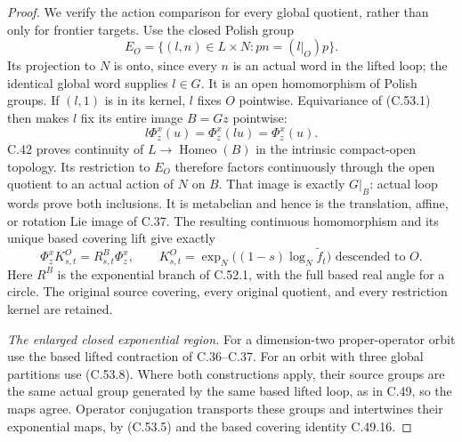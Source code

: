 \begin{proof}
We verify the action comparison for every global
quotient, rather than only for frontier targets.
Use the closed Polish group
\[
 E_O=\{(l,n)\in L\times N:pn=(l|_O)p\}.
                                                        \tag{C.53.6}
\]
Its projection to $N$ is onto, since every $n$ is an
actual word in the lifted loop; the identical global
word supplies $l\in G$. It is an open homomorphism
of Polish groups. If $(l,1)$ is in its kernel, $l$
fixes $O$ pointwise. Equivariance of (C.53.1) then
makes $l$ fix its entire image $B=Gz$ pointwise:
\[
                         l\Phi_z^x(u)=\Phi_z^x(lu)
                                      =\Phi_z^x(u).
                                                        \tag{C.53.7}
\]
C.42 proves continuity of $L\to\operatorname{Homeo}(B)$
in the intrinsic compact-open topology. Its restriction
to $E_O$ therefore factors continuously through the
open quotient to an actual action of $N$ on $B$.
That image is exactly $G|_B$: actual loop words prove
both inclusions. It is metabelian and hence is the
translation, affine, or rotation Lie image of C.37.
The resulting continuous homomorphism and its unique
based covering lift give exactly
\[
 \Phi_z^x K^O_{s,t}=R^B_{s,t}\Phi_z^x,
 \qquad K^O_{s,t}=
        \exp_N\bigl((1-s)\log_N\widetilde f_t\bigr)
                       \text{ descended to }O.         \tag{C.53.8}
\]
Here $R^B$ is the exponential branch of C.52.1,
with the full based real angle for a circle.
The original source covering, every original quotient,
and every restriction kernel are retained.

\emph{The enlarged closed exponential region.}
For a dimension-two proper-operator orbit use the
based lifted contraction of C.36--C.37. For an orbit
with three global partitions use (C.53.8).
Where both constructions apply, their source groups
are the same actual group generated by the same
based lifted loop, as in C.49, so the maps agree.
Operator conjugation transports these groups and
intertwines their exponential maps, by (C.53.5) and
the based covering identity C.49.16.


\end{proof}
